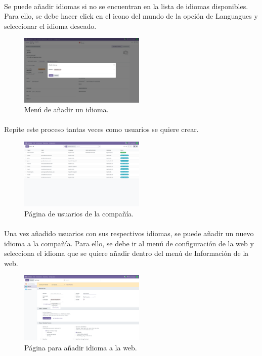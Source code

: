 \documentclass[paper=a4wide, fontsize=11pt]{report}	 %
\begin{document}
\paragraph{}
Se puede añadir idiomas si no se encuentran en la lista de idiomas disponibles. Para ello, se debe hacer click en el icono del mundo de la opción de Languagues y seleccionar el idioma deseado.
\begin{figure}[h]
    \centering
    \includegraphics[width=6cm]{añadirIdioma.png}
    \caption{Menú de añadir un idioma.}
    \label{fig:faqs}
\end{figure}
\paragraph{}
Repite este proceso tantas veces como usuarios se quiere crear.
\begin{figure}[h]
    \centering
    \includegraphics[width=6cm]{usuarios.png}
    \caption{Página de usuarios de la compañía.}
    \label{fig:faqs}
\end{figure}
\paragraph{}
Una vez añadido usuarios con sus respectivos idiomas, se puede añadir un nuevo idioma a la compañía. Para ello, se debe ir al menú de configuración de la web y selecciona el idioma que se quiere añadir dentro del menú de Información de la web.
\newpage
\begin{figure}[h]
    \centering
    \includegraphics[width=6cm]{añadirIdiomaWeb.png}
    \caption{Página para añadir idioma a la web.}
    \label{fig:faqs}
\end{figure}
\end{document}
